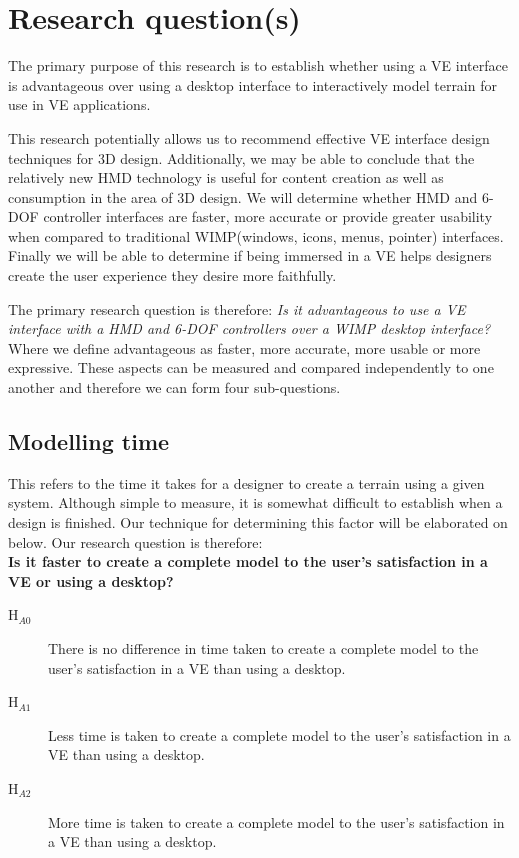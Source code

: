 \documentclass{sig-alternate-05-2015}
\begin{document}
\section{Research question(s)}
The primary purpose of this research is to establish whether using a VE interface is advantageous over using a desktop interface to interactively model terrain for use in VE applications.

This research potentially allows us to recommend effective VE interface design techniques for 3D design. Additionally, we may be able to conclude that the relatively new HMD technology is useful for content creation as well as consumption in the area of 3D design. We will determine whether HMD and 6-DOF controller interfaces are faster, more accurate or provide greater usability when compared to traditional WIMP(windows, icons, menus, pointer) interfaces. Finally we will be able to determine if being immersed in a VE helps designers create the user experience they desire more faithfully.

The primary research question is therefore: \textit{Is it advantageous to use a VE interface with a HMD and 6-DOF controllers over a WIMP desktop interface?}
Where we define advantageous as faster, more accurate, more usable or more expressive. These aspects can be measured and compared independently to one another and therefore we can form four sub-questions.
\subsection{Modelling time}
This refers to the time it takes for a designer to create a terrain using a given system. Although simple to measure, it is somewhat difficult to establish when a design is finished. Our technique for determining this factor will be elaborated on below. Our research question is therefore:\\
\textbf{Is it faster to create a complete model to the user's satisfaction in a VE or using a desktop?}\\
\begin{description}
	\item [H$_{A0}$] There is no difference in time taken to create a complete model to the user's satisfaction in a VE than using a desktop.
	\item [H$_{A1}$] Less time  is taken to create a complete model to the user's satisfaction in a VE than using a desktop.
	\item [H$_{A2}$] More time  is taken to create a complete model to the user's satisfaction in a VE than using a desktop.
\end{description}
\end{document}

